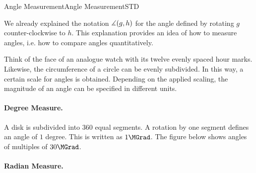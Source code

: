 \begin{MXContent}{Angle Measurement}{Angle Measurement}{STD}

We already explained the notation $\measuredangle(g,h)$ for the angle defined by rotating 
$g$ counter-clockwise to $h$. This explanation provides an idea of how to measure angles, i.e.
how to compare angles quantitatively.

Think of the face of an analogue watch with its twelve evenly spaced hour marks. Likewise, 
the circumference of a circle can be evenly subdivided. In this way, a certain scale for 
angles is obtained. Depending on the applied scaling, the magnitude of an angle can be specified in 
different units. 

\paragraph{Degree Measure.}

A disk is subdivided into $360$ equal segments. A rotation by one segment defines an
angle of $1$ degree. This is written as $1\MGrad$. The figure below shows angles 
of multiples of $30\MGrad$.

\begin{center}
\end{center}

\paragraph{Radian Measure.}


\end{MXContent}
